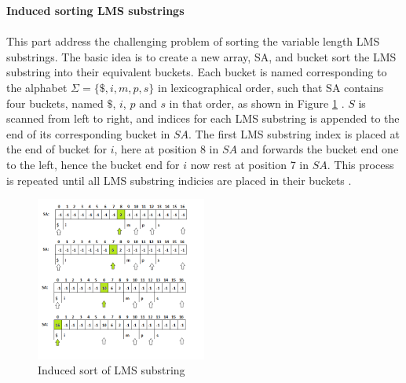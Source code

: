 \documentclass[12pt]{article} %
\begin{document}
\textbf{Induced sorting LMS substrings}
\\ \\
This part address the challenging problem of sorting the variable length LMS substrings. The basic idea is to create a new array, SA, and bucket sort the LMS substring into their equivalent buckets. Each bucket is named corresponding to the alphabet $\Sigma=\{\$,i,m,p,s\}$ in lexicographical order, such that SA contains four buckets, named $\$$, $i$, $p$ and $s$ in that order, as shown in Figure \ref{fig:SAIS_LMS} \cite{twoeffecient}.
$S$ is scanned from left to right, and indices for each LMS substring is appended to the end of its corresponding bucket in $SA$. The first LMS substring index is placed at the end of bucket for $i$, here at position 8 in $SA$ and forwards the bucket end one to the left, hence the bucket end for $i$ now rest at position 7 in $SA$. This process is repeated until all LMS substring indicies are placed in their buckets \cite{twoeffecient}.

\begin{figure}[H]
    \centering
    \includegraphics[width=0.5\textwidth]{SAIS_LMS}
    \captionsetup{width=0.8\textwidth}
    \caption{Induced sort of LMS substring}
    \label{fig:SAIS_LMS}
\end{figure}
\end{document}
